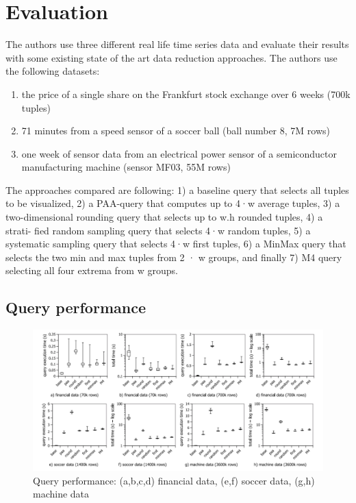 \section{Evaluation}
The authors use three different real life time series data and evaluate their results with some existing state of the art data reduction approaches.
The authors use the following datasets:
\begin{enumerate}
	\item the price of a single
	share on the Frankfurt stock exchange over 6 weeks (700k
	tuples)
	\item 71 minutes from a speed sensor of a soccer ball
	\cite{mutschler2013debs}(ball number 8, 7M rows)
	\item one week of sensor data
	from an electrical power sensor of a semiconductor manufacturing
	machine \cite{jerzak2012debs}(sensor MF03, 55M rows)
\end{enumerate}

The approaches compared are following:
1) a baseline query that selects
all tuples to be visualized, 2) a PAA-query that computes
up to 4·w average tuples, 3) a two-dimensional rounding
query that selects up to w.h rounded tuples, 4) a strati-
fied random sampling query that selects 4·w random tuples,
5) a systematic sampling query that selects 4·w first tuples,
6) a MinMax query that selects the two min and max tuples
from 2 · w groups, and finally 7)  M4 query selecting
all four extrema from w groups.

\subsection{Query performance}
\begin{figure}
	\includegraphics[width=\textwidth]{qp}
	\caption{Query performance: (a,b,c,d) financial data, (e,f) soccer data, (g,h) machine data}
	\label{qper}
\end{figure}

